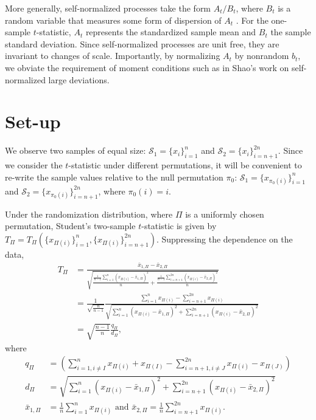 More generally, self-normalized processes take the form $A_t/B_t$,
where $B_t$ is a random variable that measures some form of dispersion
of $A_t$ \cite{de2004self}.  For the one-sample $t$-statistic, $A_t$
represents the standardized sample mean and $B_t$ the sample standard
deviation.  Since self-normalized processes are unit free, they are invariant to changes of
scale.  Importantly, by normalizing $A_t$ by nonrandom $b_t$, we
obviate the requirement of moment conditions such as in Shao's \cite{shao1997self}
work on self-normalized large deviations.

\section{Set-up}
We observe two samples of equal size: $\mathcal{S}_1 = \{x_i\}_{i=1}^n$
and $\mathcal{S}_2 = \{x_i\}_{i=n+1}^{2n}$.  Since we consider the $t$-statistic
under different permutations, it will be convenient to re-write the
sample values relative to the null permutation $\pi_0$: $\mathcal{S}_1 =
\{x_{\pi_0(i)}\}_{i=1}^n$ and $\mathcal{S}_2 = \{x_{\pi_0(i)}\}_{i=n+1}^{2n}$,
where $\pi_0(i) = i$.

Under the randomization distribution, where
$\Pi$ is a uniformly chosen permutation, Student's two-sample
$t$-statistic is given by $T_{\Pi} = T_{\Pi}(\{x_{\Pi(i)}\}_{i=1}^n,
\{x_{\Pi(i)}\}_{i=n+1}^{2n})$.  Suppressing the dependence on the
data,
\begin{align*}
T_{\Pi}
&= \frac{\bar{x}_{1,\Pi} - \bar{x}_{2,\Pi}}{\sqrt{\frac{\frac{1}{n-1}
      \sum_{i=1}^n(x_{\Pi(i)} - \bar{x}_{1,\Pi})^2}{n} + \frac{\frac{1}{n-1}
      \sum_{i=n+1}^{2n}(x_{\Pi(i)} - \bar{x}_{2,\Pi})^2}{n}}} \\
&= \frac{1}{\sqrt{\frac{n}{n-1}}} \frac{\sum_{i=1}^n x_{\Pi(i)} -
  \sum_{i=n+1}^{2n}x_{\Pi(i)}}{\sqrt{\sum_{i=1}^n(x_{\Pi(i)} -
    \bar{x}_{1,\Pi})^2 + \sum_{i=n+1}^{2n}(x_{\Pi(i)} - \bar{x}_{2,\Pi})^2}} \\
&= \sqrt{\frac{n-1}{n}}\frac{q_\Pi}{d_\Pi},
\end{align*}
where
\begin{align*}
  q_\Pi &= \left (\sum_{i=1, i\neq I}^n x_{\Pi(i)} + x_{\Pi(I)} -
    \sum_{i=n+1, i\neq J}^{2n}x_{\Pi(i)} - x_{\Pi(J)}\right ) \\
  d_\Pi &= \sqrt{\sum_{i=1}^n(x_{\Pi(i)} - \bar{x}_{1,\Pi})^2 +
    \sum_{i=n+1}^{2n}(x_{\Pi(i)} - \bar{x}_{2,\Pi})^2} \\
  \bar{x}_{1,\Pi} &= \frac{1}{n} \sum_{i=1}^n x_{\Pi(i)} \text{ and }
  \bar{x}_{2,\Pi} = \frac{1}{n} \sum_{i=n+1}^{2n} x_{\Pi(i)}.
\end{align*}

